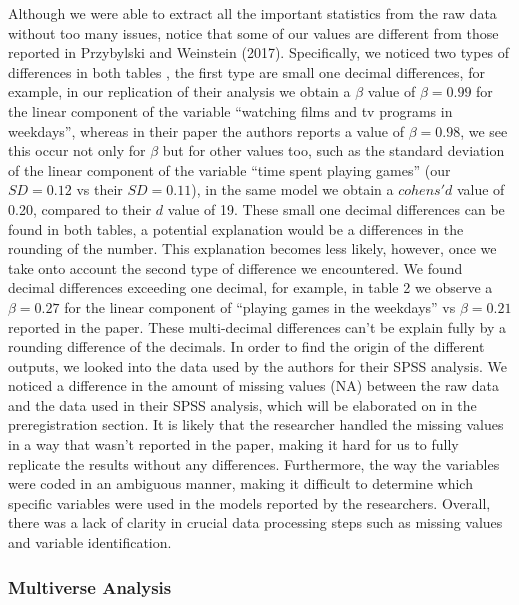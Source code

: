 \documentclass[man]{apa6}
\theoremstyle{definition}
\theoremstyle{definition}
\theoremstyle{definition}
\theoremstyle{remark}
\begin{document}
Although we were able to extract all the important statistics from the
raw data without too many issues, notice that some of our values are
different from those reported in Przybylski and Weinstein (2017).
Specifically, we noticed two types of differences in both tables , the
first type are small one decimal differences, for example, in our
replication of their analysis we obtain a \(\beta\) value of
\(\beta =0.99\) for the linear component of the variable
\enquote{watching films and tv programs in weekdays}, whereas in their
paper the authors reports a value of \(\beta=0.98\), we see this occur
not only for \(\beta\) but for other values too, such as the standard
deviation of the linear component of the variable \enquote{time spent
playing games} (our \(SD =0.12\) vs their \(SD =0.11\)), in the same
model we obtain a \(cohens'd\) value of 0.20, compared to their \(d\)
value of 19. These small one decimal differences can be found in both
tables, a potential explanation would be a differences in the rounding
of the number. This explanation becomes less likely, however, once we
take onto account the second type of difference we encountered. We found
decimal differences exceeding one decimal, for example, in table 2 we
observe a \(\beta =0.27\) for the linear component of \enquote{playing
games in the weekdays} vs \(\beta =0.21\) reported in the paper. These
multi-decimal differences can't be explain fully by a rounding
difference of the decimals. In order to find the origin of the different
outputs, we looked into the data used by the authors for their SPSS
analysis. We noticed a difference in the amount of missing values (NA)
between the raw data and the data used in their SPSS analysis, which
will be elaborated on in the preregistration section. It is likely that
the researcher handled the missing values in a way that wasn't reported
in the paper, making it hard for us to fully replicate the results
without any differences. Furthermore, the way the variables were coded
in an ambiguous manner, making it difficult to determine which specific
variables were used in the models reported by the researchers. Overall,
there was a lack of clarity in crucial data processing steps such as
missing values and variable identification.

\hypertarget{multiverse-analysis}{%
\subsubsection{Multiverse Analysis}\label{multiverse-analysis}}
\end{document}
